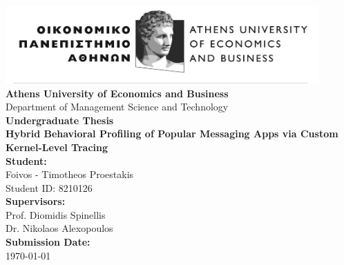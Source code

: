 \documentclass[a4paper,12pt]{report}
\begin{document}
\begin{titlepage}
    \begin{center}
        \vspace*{1.5cm}

        \includegraphics[width=0.9\textwidth]{./aueb_logo.png}\\[1cm]

        {\Large \textbf{Athens University of Economics and Business}}\\[0.5cm]
        {\large Department of Management Science and Technology}\\[1.5cm]

        {\Huge \textbf{Undergraduate Thesis}}\\[1.2cm]
        {\Large \textbf{Hybrid Behavioral Profiling of Popular Messaging Apps
       via Custom Kernel-Level Tracing}}\\[2cm]
        \textbf{Student:}\\
        Foivos - Timotheos Proestakis\\
        Student ID: 8210126\\[1.5cm]

        \textbf{Supervisors:}\\
        Prof. Diomidis Spinellis \\
        Dr. Nikolaos Alexopoulos\\[1.5cm]

        \vfill
        \textbf{Submission Date:}\\
        \today
        \vspace*{1cm}
    \end{center}
\end{titlepage}
\clearpage
\end{document}
